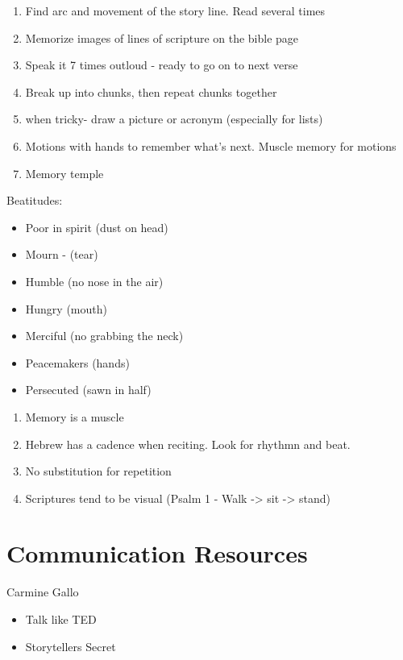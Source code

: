 \documentclass[
]{book}
\providecommand{\tightlist}{%
  \setlength{\itemsep}{0pt}\setlength{\parskip}{0pt}}
\begin{document}
\begin{enumerate}
\def\labelenumi{\arabic{enumi})}
\item
  Find arc and movement of the story line. Read several times
\item
  Memorize images of lines of scripture on the bible page
\item
  Speak it 7 times outloud - ready to go on to next verse
\item
  Break up into chunks, then repeat chunks together
\item
  when tricky- draw a picture or acronym (especially for lists)
\item
  Motions with hands to remember what's next. Muscle memory for motions
\item
  Memory temple
\end{enumerate}

Beatitudes:

\begin{itemize}
\tightlist
\item
  Poor in spirit (dust on head)
\item
  Mourn - (tear)
\item
  Humble (no nose in the air)
\item
  Hungry (mouth)
\item
  Merciful (no grabbing the neck)
\item
  Peacemakers (hands)
\item
  Persecuted (sawn in half)
\end{itemize}

\begin{enumerate}
\def\labelenumi{\arabic{enumi})}
\setcounter{enumi}{7}
\item
  Memory is a muscle
\item
  Hebrew has a cadence when reciting. Look for rhythmn and beat.
\item
  No substitution for repetition
\item
  Scriptures tend to be visual (Psalm 1 - Walk -\textgreater{} sit -\textgreater{} stand)
\end{enumerate}

\hypertarget{communication-resources}{%
\chapter{Communication Resources}\label{communication-resources}}

Carmine Gallo

\begin{itemize}
\tightlist
\item
  Talk like TED
\item
  Storytellers Secret
\end{itemize}
\end{document}
